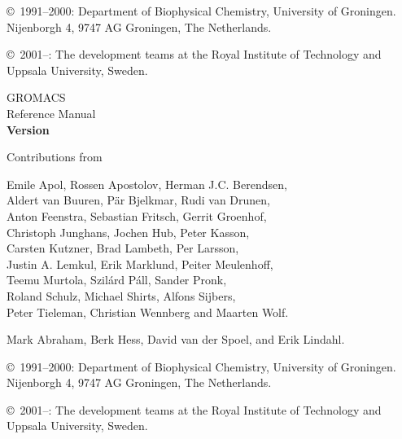 \documentclass[11pt,a4paper,twoside]{gmxmanual}
\newcommand{\projectContributors}{
Emile Apol, Rossen Apostolov, Herman J.C. Berendsen, \\
Aldert van Buuren, P\"ar Bjelkmar, Rudi van Drunen, \\
Anton Feenstra, Sebastian Fritsch, Gerrit Groenhof, \\
Christoph Junghans, Jochen Hub, Peter Kasson, \\
Carsten Kutzner, Brad Lambeth, Per Larsson, \\
Justin A. Lemkul, Erik Marklund, Peiter Meulenhoff, \\
Teemu Murtola, Szil\'ard P\'all, Sander Pronk, \\
Roland Schulz, Michael Shirts, Alfons Sijbers, \\
Peter Tieleman, Christian Wennberg and Maarten Wolf.
}
\newcommand{\projectLeaders}{
     Mark Abraham, Berk Hess, David van der Spoel, and Erik Lindahl.
 }
\begin{document}
\vspace{2cm}

\noindent \copyright\ 1991--2000: 
Department of Biophysical Chemistry, University of Groningen. 
Nijenborgh 4, 9747 AG Groningen, The Netherlands.\\
\medskip

\noindent \copyright\ 2001--{\gmxyear}:
The {\gromacs} development teams at the Royal Institute of Technology and \\
Uppsala University, Sweden.

\cleardoublepage

\addtolength{\oddsidemargin}{5mm}

%
%
\renewcommand{\chaptermark}[1]{\markboth{#1}{#1}} %
\renewcommand{\sectionmark}[1]{\markright{\thesection\ #1}}
\lhead[\fancyplain{}{\em\thepage}]{\fancyplain{}{\em\rightmark}}
\rhead[\fancyplain{}{\em\leftmark}]{\fancyplain{}{\em\thepage}}
\cfoot{}


\begin{center}
\phantom{ }
\vspace{1cm}
{\fontsize{40}{50} \selectfont 
GROMACS\\
Reference Manual\\[1cm]
}
{\LARGE\bf Version \gmxver}\\[1cm]

{\Large 
Contributions from \\
\vspace{5mm}

\projectContributors}
\vspace{5mm}

{\LARGE \projectLeaders}
\vspace{10mm}
\end{center}

\vfill


\noindent \copyright\ 1991--2000: 
Department of Biophysical Chemistry, University of Groningen. \\
Nijenborgh 4, 9747 AG Groningen, The Netherlands.\\
\medskip

\noindent \copyright\ 2001--{\gmxyear}:
The {\gromacs} development teams at the Royal Institute of Technology and \\
Uppsala University, Sweden.

\vspace{5mm}
\end{document}
